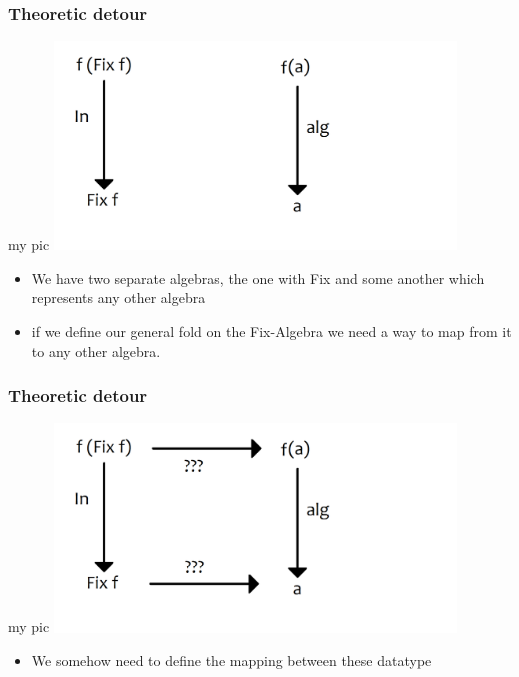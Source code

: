 \documentclass[10pt]{beamer}
\begin{document}
\begin{frame}[fragile]
\frametitle{Theoretic detour}

\begin{block}{my pic}
\includegraphics[width=0.8\textwidth]{graf1.png}	
\end{block}
\begin{itemize}
\item We have two separate algebras, the one with Fix and some another which represents any other algebra
\item if we define our general fold on the Fix-Algebra we need a way to map from it to any other algebra.	
\end{itemize}

\end{frame}






\begin{frame}[fragile]
\frametitle{Theoretic detour}

\begin{block}{my pic}
\includegraphics[width=0.8\textwidth]{graf2.png}	
\end{block}
\begin{itemize}
\item We somehow need to define the mapping between these datatype
\end{itemize}

\end{frame}
\end{document}
